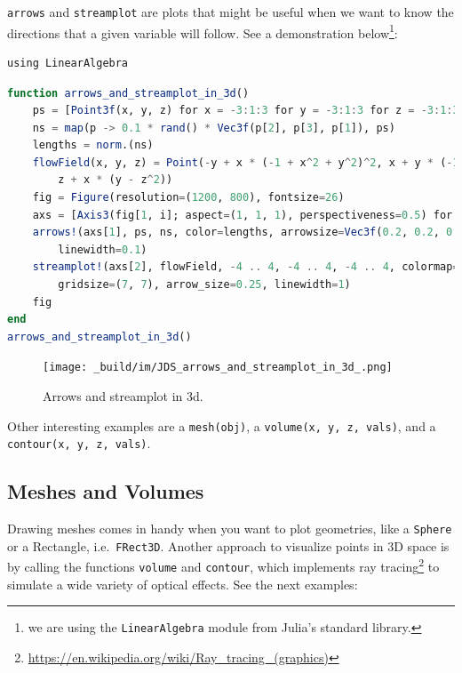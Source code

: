 \documentclass[
  notoc %
]{tufte-book}
\DeclareRobustCommand{\href}[2]{#2\footnote{\url{#1}}}
\newcommand{\passthrough}[1]{#1}
\begin{document}
\passthrough{\lstinline!arrows!} and
\passthrough{\lstinline!streamplot!} are plots that might be useful when
we want to know the directions that a given variable will follow. See a
demonstration below\footnote{we are using the
  \passthrough{\lstinline!LinearAlgebra!} module from Julia's standard
  library.}:

\begin{lstlisting}
using LinearAlgebra
\end{lstlisting}

\begin{lstlisting}[language=Julia]
function arrows_and_streamplot_in_3d()
    ps = [Point3f(x, y, z) for x = -3:1:3 for y = -3:1:3 for z = -3:1:3]
    ns = map(p -> 0.1 * rand() * Vec3f(p[2], p[3], p[1]), ps)
    lengths = norm.(ns)
    flowField(x, y, z) = Point(-y + x * (-1 + x^2 + y^2)^2, x + y * (-1 + x^2 + y^2)^2,
        z + x * (y - z^2))
    fig = Figure(resolution=(1200, 800), fontsize=26)
    axs = [Axis3(fig[1, i]; aspect=(1, 1, 1), perspectiveness=0.5) for i = 1:2]
    arrows!(axs[1], ps, ns, color=lengths, arrowsize=Vec3f(0.2, 0.2, 0.3),
        linewidth=0.1)
    streamplot!(axs[2], flowField, -4 .. 4, -4 .. 4, -4 .. 4, colormap=:plasma,
        gridsize=(7, 7), arrow_size=0.25, linewidth=1)
    fig
end
arrows_and_streamplot_in_3d()
\end{lstlisting}

\begin{figure}
\hypertarget{fig:arrows_and_streamplot_in_3d}{%
\centering
\texttt{[image: \_build/im/JDS\_arrows\_and\_streamplot\_in\_3d\_.png]}
\caption{Arrows and streamplot in
3d.}\label{fig:arrows_and_streamplot_in_3d}
}
\end{figure}

Other interesting examples are a \passthrough{\lstinline!mesh(obj)!}, a
\passthrough{\lstinline!volume(x, y, z, vals)!}, and a
\passthrough{\lstinline!contour(x, y, z, vals)!}.

\hypertarget{meshes-and-volumes}{%
\subsection{Meshes and Volumes}\label{meshes-and-volumes}}

Drawing meshes comes in handy when you want to plot geometries, like a
\passthrough{\lstinline!Sphere!} or a Rectangle,
i.e.~\passthrough{\lstinline!FRect3D!}. Another approach to visualize
points in 3D space is by calling the functions
\passthrough{\lstinline!volume!} and \passthrough{\lstinline!contour!},
which implements
\href{https://en.wikipedia.org/wiki/Ray_tracing_(graphics)}{ray tracing}
to simulate a wide variety of optical effects. See the next examples:
\end{document}
